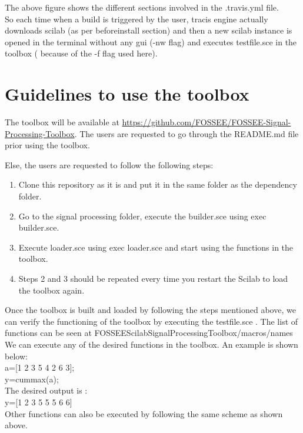 \documentclass[12pt,a4paper]{report}
\begin{document}
The above figure shows the different sections involved in the .travis.yml file.\\
So each time when a build is triggered by the user, tracis engine actually downloads scilab (as per before\textunderscore install section) and then a new scilab instance is opened in the terminal without any gui (-nw flag) and executes testfile.sce in the toolbox ( because of the -f flag used here).


\section{Guidelines to use the toolbox}
The toolbox will be available at \url{https://github.com/FOSSEE/FOSSEE-Signal-Processing-Toolbox}.
The users are requested to go through the README.md file prior using the toolbox.

Else, the users are requested to follow the following steps:
\begin{enumerate}
\item Clone this repository as it is and put it in the same folder as the dependency folder.
\item Go to the signal processing folder, execute the builder.sce using exec builder.sce.
\item Execute loader.sce using exec loader.sce and start using the functions in the toolbox.
\item Steps 2 and 3 should be repeated every time you restart the Scilab to load the toolbox again.
\end{enumerate}

Once the toolbox is built and loaded by following the steps mentioned above, we can verify the functioning of the toolbox by executing the testfile.sce .
The list of functions can be seen at FOSSEE\textunderscore Scilab\textunderscore Signal\textunderscore Processing\textunderscore Toolbox/macros/names\\

We can execute any of the desired functions in the toolbox. An example is shown below: \\

a=[1 2 3 5 4 2 6 3]; \\
   y=cummax(a); \\

The desired output is :\\
    y=[1 2 3 5 5 5 6 6] \\

Other functions can also be executed by following the same scheme as shown above.
\end{document}
